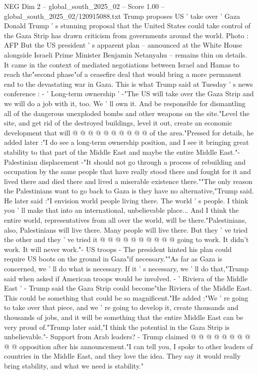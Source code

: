 \begin{textsample}{NEG Dim 2 – global\_south\_2025\_02 – Score 1.00 – global\_south\_2025\_02/120915088.txt}  \label{ex:f2_neg_023}
Trump proposes US ' take over ' Gaza Donald Trump ' s stunning proposal that the United States could take control of the Gaza Strip has drawn criticism from governments around the world.
Photo : AFP But the US president ' s apparent plan -- announced at the White House alongside Israeli Prime Minister Benjamin Netanyahu -- remains thin on details.
It came in the context of mediated negotiations between Israel and Hamas to reach the"second phase"of a ceasefire deal that would bring a more permanent end to the devastating war in Gaza.
This is what Trump said at Tuesday ' s news conference : - ' Long-term ownership ' -"The US will take over the Gaza Strip and we will do a job with it, too.
We ' ll own it.
And be responsible for dismantling all of the dangerous unexploded bombs and other weapons on the site."Level the site, and get rid of the destroyed buildings, level it out, create an economic development that will @ @ @ @ @ @ @ @ @ @ of the area."Pressed for details, he added later :"I do see a long-term ownership position, and I see it bringing great stability to that part of the Middle East and maybe the entire Middle East."- Palestinian displacement -"It should not go through a process of rebuilding and occupation by the same people that have really stood there and fought for it and lived there and died there and lived a miserable existence there.""The only reason the Palestinians want to go back to Gaza is they have no alternative,"Trump said.
He later said :"I envision world people living there.
The world ' s people.
I think you ' ll make that into an international, unbelievable place...
And I think the entire world, representatives from all over the world, will be there."Palestinians, also, Palestinians will live there.
Many people will live there.
But they ' ve tried the other and they ' ve tried it @ @ @ @ @ @ @ @ @ @ going to work.
It didn't work.
It will never work."- US troops - The president hinted his plan could require US boots on the ground in Gaza"if necessary.""As far as Gaza is concerned, we ' ll do what is necessary.
If it ' s necessary, we ' ll do that,"Trump said when asked if American troops would be involved. - ' Riviera of the Middle East ' - Trump said the Gaza Strip could become"the Riviera of the Middle East.
This could be something that could be so magnificent."He added :"We ' re going to take over that piece, and we ' re going to develop it, create thousands and thousands of jobs, and it will be something that the entire Middle East can be very proud of."Trump later said,"I think the potential in the Gaza Strip is unbelievable."- Support from Arab leaders? - Trump claimed @ @ @ @ @ @ @ @ @ @ opposition after his announcement."I can tell you, I spoke to other leaders of countries in the Middle East, and they love the idea.
They say it would really bring stability, and what we need is stability."

\end{textsample}
